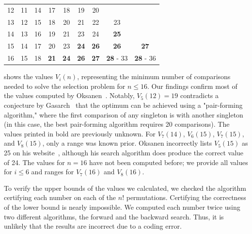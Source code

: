\documentclass[twoside,leqno,twocolumn]{article}
\begin{document}
\begin{table}[!t]
\begin{tabular}{c|cccccccc}
    12  & 11                      & 14 & 17          & 18          & 19          & 20                                                \\
    13  & 12                      & 15 & 18          & 20          & 21          & 22          & 23                                  \\
    14  & 13                      & 16 & 19          & 21          & 23          & 24          & \textbf{25}                         \\
    15  & 14                      & 17 & 20          & 23          & \textbf{24} & \textbf{26} & \textbf{26}      & \textbf{27}      \\
    16  & 15                      & 18 & \textbf{21} & \textbf{24} & \textbf{26} & \textbf{27} & \textbf{28} - 33 & \textbf{28} - 36 \\
  \end{tabular}
\end{table}

 shows the values $V_i(n)$, representing the minimum number of comparisons needed to solve the selection problem for $n \leq 16$.
Our findings confirm most of the values computed by Oksanen~\cite{Oksanen}.
Notably, $V_5(12) = 19$ contradicts a conjecture by Gasarch~\cite{Gasarch1996} that the optimum can be achieved using a "pair-forming algorithm," where the first comparison of any singleton is with another singleton (in this case, the best pair-forming algorithm requires 20 comparisons).
The values printed in bold are previously unknown.
For $V_7(14)$, $V_6(15)$, $V_7(15)$, and $V_8(15)$, only a range was known prior.
Oksanen incorrectly lists $V_5(15)$ as 25 on his website~\cite{Oksanen}, although his search algorithm does produce the correct value of 24.
The values for $n = 16$ have not been computed before; we provide all values for $i \leq 6$ and ranges for $V_7(16)$ and $V_8(16)$.

To verify the upper bounds of the values we calculated, we checked the algorithm certifying each number on each of the $n!$ permutations.
Certifying the correctness of the lower bound is nearly impossible.
We computed each number twice using two different algorithms, the forward and the backward search.
Thus, it is unlikely that the results are incorrect due to a coding error.
\end{document}
